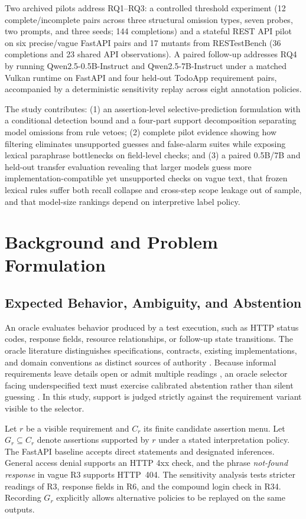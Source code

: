 \documentclass[sigconf,nonacm]{acmart}
\begin{document}
Two archived pilots address RQ1--RQ3: a controlled threshold experiment (12 complete/incomplete pairs across three structural omission types, seven probes, two prompts, and three seeds; 144 completions) and a stateful REST API pilot on six precise/vague FastAPI pairs and 17 mutants from RESTestBench \cite{kogler2026bench,restestrepo} (36 completions and 23 shared API observations). A paired follow-up addresses RQ4 by running Qwen2.5-0.5B-Instruct and Qwen2.5-7B-Instruct under a matched Vulkan runtime on FastAPI and four held-out TodoApp requirement pairs, accompanied by a deterministic sensitivity replay across eight annotation policies.

The study contributes: (1) an assertion-level selective-prediction formulation with a conditional detection bound and a four-part support decomposition separating model omissions from rule vetoes; (2) complete pilot evidence showing how filtering eliminates unsupported guesses and false-alarm suites while exposing lexical paraphrase bottlenecks on field-level checks; and (3) a paired 0.5B/7B and held-out transfer evaluation revealing that larger models guess more implementation-compatible yet unsupported checks on vague text, that frozen lexical rules suffer both recall collapse and cross-step scope leakage out of sample, and that model-size rankings depend on interpretive label policy.

\section{Background and Problem Formulation}
\subsection{Expected Behavior, Ambiguity, and Abstention}
An oracle evaluates behavior produced by a test execution, such as HTTP status codes, response fields, resource relationships, or follow-up state transitions. The oracle literature distinguishes specifications, contracts, existing implementations, and domain conventions as distinct sources of authority \cite{barr2015,mughal2026}. Because informal requirements leave details open or admit multiple readings \cite{berry2004}, an oracle selector facing underspecified text must exercise calibrated abstention rather than silent guessing \cite{wen2025,elyaniv2010}. In this study, support is judged strictly against the requirement variant visible to the selector.

Let $r$ be a visible requirement and $C_r$ its finite candidate assertion menu. Let $G_r\subseteq C_r$ denote assertions supported by $r$ under a stated interpretation policy. The FastAPI baseline accepts direct statements and designated inferences. General access denial supports an HTTP 4xx check, and the phrase \emph{not-found response} in vague R3 supports HTTP~404. The sensitivity analysis tests stricter readings of R3, response fields in R6, and the compound login check in R34. Recording $G_r$ explicitly allows alternative policies to be replayed on the same outputs.
\end{document}
